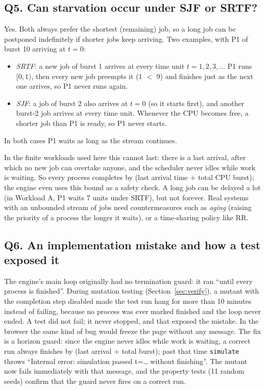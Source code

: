 \documentclass[11pt,a4paper]{article}
\begin{document}
\subsection*{Q5. Can starvation occur under SJF or SRTF?}

Yes. Both always prefer the shortest (remaining) job, so a long job can be postponed indefinitely if shorter jobs keep
arriving. Two examples, with P1 of burst 10 arriving at $t=0$:
\begin{itemize}
  \item \emph{SRTF}: a new job of burst 1 arrives at every time unit $t=1,2,3,\dots$ P1 runs $[0,1)$, then every
    new job preempts it (1 $<$ 9) and finishes just as the next one arrives, so P1 never runs again.
  \item \emph{SJF}: a job of burst 2 also arrives at $t=0$ (so it starts first), and another burst-2 job arrives at
    every time unit. Whenever the CPU becomes free, a shorter job than P1 is ready, so P1 never starts.
\end{itemize}
In both cases P1 waits as long as the stream continues.

In the finite workloads used here this cannot last: there is a last arrival, after which no new job can overtake anyone,
and the scheduler never idles while work is waiting. So every process completes by (last arrival time + total CPU
burst); the engine even uses this bound as a safety check. A long job can be delayed a lot (in Workload A, P1 waits 7
units under SRTF), but not forever. Real systems with an unbounded stream of jobs need countermeasures such as
\emph{aging} (raising the priority of a process the longer it waits), or a time-sharing policy like RR.

\subsection*{Q6. An implementation mistake and how a test exposed it}

The engine's main loop originally had no termination guard: it ran ``until every process is finished''. During mutation
testing (Section~\ref{sec:verify}), a mutant with the completion step disabled made the test run hang for more than 10 minutes instead of
failing, because no process was ever marked finished and the loop never ended. A test did not fail; it never stopped,
and that exposed the mistake. In the browser the same kind of bug would freeze the page without any message. The fix is
a horizon guard: since the engine never idles while work is waiting, a correct run always finishes by (last arrival +
total burst); past that time \texttt{simulate} throws ``Internal error: simulation passed t=\dots{} without finishing''.
The mutant now fails immediately with that message, and the property tests (11 random seeds) confirm that the guard never
fires on a correct run.
\end{document}
